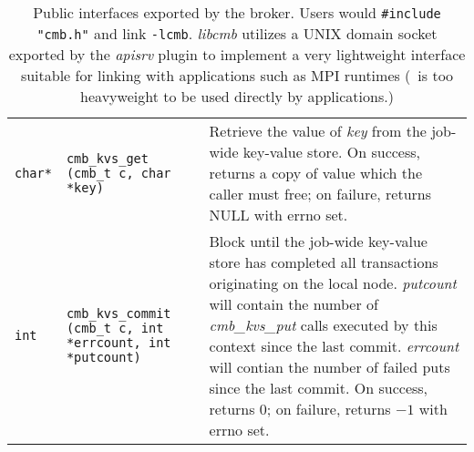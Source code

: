 \begin{table}
\begin{tabular}{|p{0.7cm}p{5cm}|p{9cm}|}
{\tt {char*}}
  & {\tt cmb\_kvs\_get (cmb\_t c, char {*key})}
  & Retrieve the value of {\em key} from the job-wide key-value store.
    On success, returns a copy of value which the caller must free;
    on failure, returns NULL with errno set.\\
{\tt int}
  & {\tt cmb\_kvs\_commit (cmb\_t c, int *errcount, int *putcount)}
  & Block until the job-wide key-value store has completed all transactions
    originating on the local node.  {\em putcount} will contain the number
    of {\em cmb\_kvs\_put} calls executed by this context since the last commit.
    {\em errcount} will contian the number of failed puts since the last commit.
    On success, returns $0$; on failure, returns $-1$ with errno set.\\
\hline
\end{tabular}
\caption{Public interfaces exported by the broker.  Users would
{\tt \#include "cmb.h"} and link {\tt -lcmb}.  {\em libcmb} utilizes
a UNIX domain socket exported by the {\em apisrv} plugin to implement
a very lightweight interface suitable for linking with applications such
as MPI runtimes (\zMQ\ is too heavyweight to be used directly by applications.)}
\label{tab:cmbapi}
\end{table}


